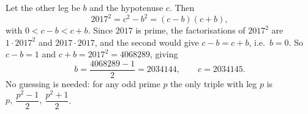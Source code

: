 Let the other leg be $b$ and the hypotenuse $c$. Then
\[
2017^2=c^2-b^2=(c-b)(c+b),
\]
with $0<c-b<c+b$. Since $2017$ is prime, the factorisations of $2017^2$ are $1\cdot2017^2$ and $2017\cdot2017$, and the second would give $c-b=c+b$, i.e.\ $b=0$. So $c-b=1$ and $c+b=2017^2=4068289$, giving
\[
b=\dfrac{4068289-1}{2}=\boxed{2034144},\qquad c=2034145 .
\]
No guessing is needed: for any odd prime $p$ the only triple with leg $p$ is $p,\ \dfrac{p^2-1}{2},\ \dfrac{p^2+1}{2}$.
